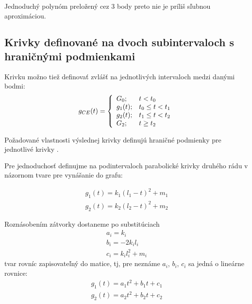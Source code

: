 Jednoduchý polynóm preložený cez 3 body preto nie je príliš sľubnou aproximáciou.


\subsection{Krivky definované na dvoch subintervaloch s hraničnými podmienkami}

Krivku možno tiež definovať zvlášť na jednotlivých intervaloch medzi danými bodmi:
\begin{equation}
	g_{CE}(t) = 
	\left\{
	\begin{array}{l l}
		G_0;	& t<t_0 \\
		g_1(t);	& t_0 \leq t < t_1 \\
		g_2(t);	& t_1 \leq t < t_2 \\
		G_2;		& t \geq t_2
	\end{array}
	\right.
	\label{eq:krivka_subintervaly_gong1g2goff}
\end{equation}

Požadované vlastnosti výslednej krivky definujú hraničné podmienky pre jednotlivé krivky
.

Pre jednoduchosť definujme na podintervaloch parabolické krivky druhého rádu v názornom tvare pre vynášanie do grafu:

\begin{subequations} 
	\label{eq:def_g1_g2_klm_obe}
	\begin{align}
		g_1(t) = k_1 (l_1 - t)^2 + m_1	%
		\\
		g_2(t) = k_2 (l_2 - t)^2 + m_2	%
	\end{align}
\end{subequations}

Roznásobením zátvorky dostaneme po substitúciach
\begin{subequations} 
	\label{eq:subst_klm2abc}
	\begin{align}
		a_i = k_i\\
		b_i = -2 k_i l_i\\
		c_i = k_i l_i^2 + m_i
	\end{align}
\end{subequations}
tvar rovníc zapisovateľný do matice, tj, pre neznáme $a_i$, $b_i$, $c_i$ sa jedná o lineárne rovnice:
\begin{subequations} 
	\label{eq:def_g1_g2_abc_obe}
	\begin{align}
		g_1(t) = a_1 t^2 + b_1 t + c_1	\label{eq:def_g1_g2_abc_1}\\
		g_2(t) = a_2 t^2 + b_2 t + c_2	\label{eq:def_g1_g2_abc_2}
	\end{align}
\end{subequations}


